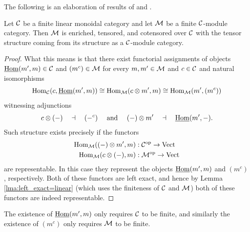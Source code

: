 \documentclass{amsart}
\begin{document}

The following is an elaboration of results of \cite{MR1976459} and \cite{EO-FTC}. %
\begin{proposition} \label{thm:enrichment-of-mod-cats}
	Let $\mathcal C$ be a finite linear monoidal category and let $\mathcal M$ be a finite $\mathcal C$-module category. Then $\mathcal M$ is enriched, tensored, and cotensored over $\mathcal C$ with the tensor structure coming from its structure as a $\mathcal C$-module category.
\end{proposition}

\begin{proof}
	What this means is that there exist functorial assignments of objects $\operatorname{\underline{Hom}}(m', m) \in \mathcal C$ and $(m^c) \in \mathcal M$ for every $m,m' \in \mathcal M$ and $c \in \mathcal C$ and natural isomorphisms
	\begin{equation*}
		\operatorname{Hom}_\mathcal C(c, \operatorname{\underline{Hom}}(m', m)) \cong \operatorname{Hom}_\mathcal M(c \otimes m', m) \cong \operatorname{Hom}_\mathcal M( m', (m^c))
	\end{equation*}
	witnessing adjunctions
	\begin{equation*}
			c \otimes (-) \quad \dashv\quad (-^c) \quad \textrm{ and } \quad (-) \otimes m' \quad \dashv \quad \operatorname{\underline{Hom}}(m', -).
	\end{equation*}
Such structure exists precisely if the functors
\begin{align*}
	\operatorname{Hom}_\mathcal M((-)\otimes m', m): \; & \mathcal C^{\mathrm{op}} \to \mathrm{Vect} \\
	\operatorname{Hom}_\mathcal M(c \otimes (-), m): \; & \mathcal M^{\mathrm{op}} \to \mathrm{Vect}
\end{align*}
are representable. In this case they represent the objects $\operatorname{\underline{Hom}}(m', m)$ and $(m^c)$, respectively. Both of these functors are left exact, and hence by Lemma \ref{lma:left_exact=linear} (which uses the finiteness of $\mathcal C$ and $\mathcal M$) both of these functors are indeed representable. 
\end{proof}

\begin{remark}
	The existence of $\operatorname{\underline{Hom}}(m', m)$ only requires $\mathcal C$ to be finite, and similarly the existence of $(m^c)$ only requires $\mathcal M$ to be finite.
\end{remark}
\end{document}

